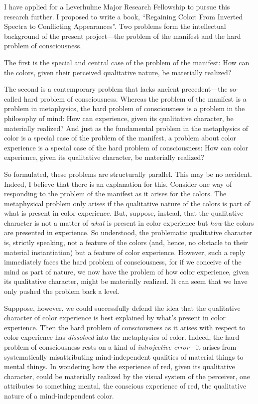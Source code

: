 \documentclass[contbibnum]{cv}
\begin{document}
I have applied for a Leverhulme Major Research Fellowship to pursue this research further. I proposed to write a book, ``Regaining Color: From Inverted Spectra to Conflicting Appearances''. Two problems form the intellectual background of the present project---the problem of the manifest and the hard problem of consciousness. 

The first is the special and central case of the problem of the manifest: How can the colors, given their perceived qualitative nature, be materially realized?

The second is a contemporary problem that lacks ancient precedent---the so-called hard problem of consciousness. Whereas the problem of the manifest is a problem in metaphysics, the hard problem of consciousness is a problem in the philosophy of mind: How can experience, given its qualitative character, be materially realized? And just as the fundamental problem in the metaphysics of color is a special case of the problem of the manifest, a problem about color experience is a special case of the hard problem of consciousness: How can color experience, given its qualitative character, be materially realized?

So formulated, these problems are structurally parallel. This may be no accident. Indeed, I believe that there is an explanation for this. Consider one way of responding to the problem of the manifest as it arises for the colors. The metaphysical problem only arises if the qualitative nature of the colors is part of what is present in color experience. But, suppose, instead, that the qualitative character is not a matter of \emph{what} is present in color experience but \emph{how} the colors are presented in experience. So understood, the problematic qualitative character is, strictly speaking, not a feature of the colors (and, hence, no obstacle to their material instantiation) but a feature of color experience. However, such a reply immediately faces the hard problem of consciousness, for if we conceive of the mind as part of nature, we now have the problem of how color experience, given its qualitative character, might be materially realized. It can seem that we have only pushed the problem back a level.

Supppose, however, we could successfully defend the idea that the qualitative character of color experience is best explained by what's present in color experience. Then the hard problem of consciousness as it arises with respect to color experience has \emph{dissolved} into the metaphysics of color. Indeed, the hard problem of consciousness rests on a kind of \emph{introjective error}---it arises from systematically misattributing mind-independent qualities of material things to mental things. In wondering how the experience of red, given its qualitative character, could be materially realized by the visual system of the perceiver, one attributes to something mental, the conscious experience of red, the qualitative nature of a mind-independent color.
\end{document}
